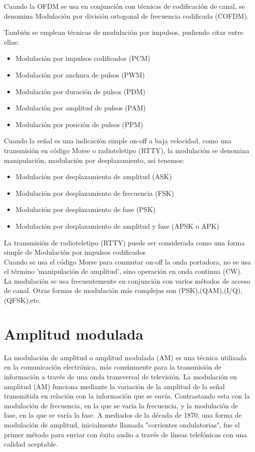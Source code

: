 \documentclass[a4paper]{article}
\begin{document}
Cuando la OFDM se usa en conjunción con técnicas de codificación de canal, se denomina Modulación por división ortogonal de frecuencia codificada (COFDM).

También se emplean técnicas de modulación por impulsos, pudiendo citar entre ellas:

\begin{itemize}
	\item Modulación por impulsos codificados (PCM)
	\item Modulación por anchura de pulsos (PWM)
	\item Modulación por duración de pulsos (PDM)
	\item Modulación por amplitud de pulsos (PAM)
	\item Modulación por posición de pulsos (PPM)
\end{itemize}


Cuando la señal es una indicación simple on-off a baja velocidad, como una transmisión en código Morse o radioteletipo (RTTY), la modulación se denomina manipulación, modulación por desplazamiento, así tenemos:

\begin{itemize}
	\item Modulación por desplazamiento de amplitud (ASK)
	\item Modulación por desplazamiento de frecuencia (FSK)
	\item Modulación por desplazamiento de fase (PSK)
	\item Modulación por desplazamiento de amplitud y fase (APSK o APK)	
\end{itemize}




La transmisión de radioteletipo (RTTY) puede ser considerada como una forma simple de Modulación por impulsos codificados
\\
Cuando se usa el código Morse para conmutar on-off la onda portadora, no se usa el término 'manipulación de amplitud', sino operación en onda continua (CW).
\\
La modulación se usa frecuentemente en conjunción con varios métodos de acceso de canal. Otras formas de modulación más complejas son (PSK),(QAM),(I/Q),(QFSK),etc. 

\section{Amplitud modulada}

La modulación de amplitud o amplitud modulada (AM) es una técnica utilizada en la comunicación electrónica, más comúnmente para la transmisión de información a través de una onda transversal de televisión. La modulación en amplitud (AM) funciona mediante la variación de la amplitud de la señal transmitida en relación con la información que se envía. Contrastando esta con la modulación de frecuencia, en la que se varía la frecuencia, y la modulación de fase, en la que se varía la fase. A mediados de la década de 1870, una forma de modulación de amplitud, inicialmente llamada "corrientes ondulatorias", fue el primer método para enviar con éxito audio a través de líneas telefónicas con una calidad aceptable. 
\end{document}
